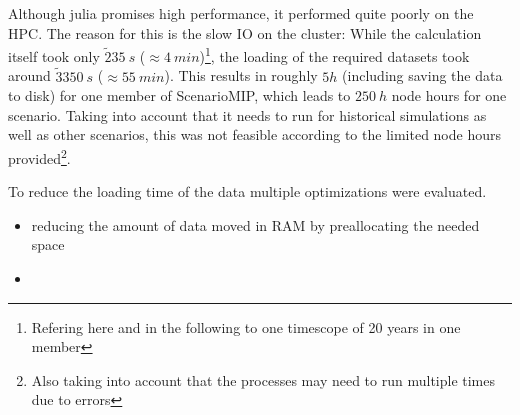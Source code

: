Although julia promises high performance, it performed quite poorly on the HPC.
The reason for this is the slow IO on the cluster: While the calculation itself took only $\tilde 235~s$ ($\approx 4~min$)\footnote{Refering here and  in the following to one timescope of 20 years in one member}, the loading of the required datasets took around $\tilde 3350~s$ ($\approx 55~min$). 
This results in roughly $5 h$ (including saving the data to disk) for one member of ScenarioMIP, which leads to $250~h$ node hours for one scenario. 
Taking into account that it needs to run for historical simulations as well as other scenarios, this was not feasible according to the limited node hours provided\footnote{Also taking into account that the processes may need to run multiple times due to errors}.

To reduce the loading time of the data multiple optimizations were evaluated. 

\begin{itemize}
  \item reducing the amount of data moved in RAM by preallocating the needed space
  \item 
\end{itemize}
%
%
%
%     
%
